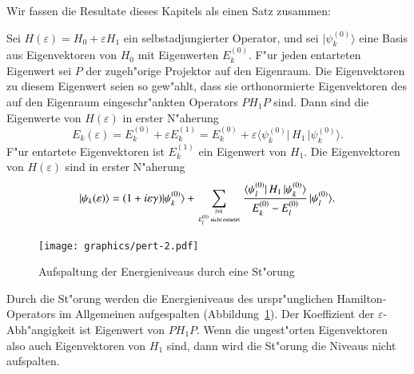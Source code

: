 Wir fassen die Resultate dieses Kapitels als einen Satz zusammen:

\begin{satz}
Sei $H(\varepsilon)=H_0+\varepsilon H_1$ ein selbstadjungierter Operator,
und sei $|\psi_k^{(0)}\rangle$ eine Basis aus Eigenvektoren von $H_0$
mit Eigenwerten $E_k^{(0)}$.
F"ur jeden entarteten Eigenwert sei $P$ der zugeh"orige Projektor auf
den Eigenraum.
Die Eigenvektoren zu diesem Eigenwert seien so gew"ahlt, dass sie
orthonormierte Eigenvektoren des auf den Eigenraum eingeschr"ankten
Operators  $PH_1P$ sind.
Dann sind die Eigenwerte von $H(\varepsilon)$ in erster N"aherung
\[
E_k(\varepsilon)
=
E_k^{(0)}+\varepsilon E_k^{(1)}
=
E_k^{(0)}+\varepsilon\langle \psi_k^{(0)}|\,H_1\,|\psi_k^{(0)}\rangle.
\]
F"ur entartete Eigenvektoren ist $E_k^{(1)}$ ein Eigenwert von $H_1$.
Die Eigenvektoren von $H(\varepsilon)$ sind in erster N"aherung
\[
|\psi_k(\varepsilon)\rangle
=
(1+i\varepsilon\gamma)|\psi_k^{(0)}\rangle
+
\sum_{{l\ne k}\atop{\text{$E_l^{(0)}$ nicht entartet}}}
\frac{
\langle \psi_l^{(0)}|\,H_1\,|\psi_k^{(0)}\rangle
}{
E_k^{(0)}-E_l^{(0)}
}
\,|\psi_l^{(0)}\rangle.
\]
\end{satz}

\begin{figure}
\centering
\texttt{[image: graphics/pert-2.pdf]}
\caption{Aufspaltung der Energieniveaus durch eine St"orung
\label{aufspaltung}}
\end{figure}
Durch die St"orung werden die Energieniveaus des urspr"unglichen
Hamilton-Operators im Allgemeinen aufgespalten (Abbildung~\ref{aufspaltung}).
Der Koeffizient der $\varepsilon$-Abh"angigkeit ist Eigenwert von $PH_1P$. 
Wenn die ungest"orten Eigenvektoren also auch Eigenvektoren von $H_1$ sind,
dann wird die St"orung die Niveaus nicht aufspalten.

